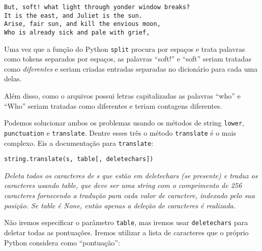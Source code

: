 \beforeverb
\begin{verbatim}
But, soft! what light through yonder window breaks?
It is the east, and Juliet is the sun.
Arise, fair sun, and kill the envious moon,
Who is already sick and pale with grief,
\end{verbatim}
\afterverb
%
Uma vez que a função do Python {\tt split} procura por espaços e trata palavras como tokens separados por espaços, as palavras ``soft!'' e ``soft'' seriam tratadas como \emph{diferentes} e seriam criadas entradas separadas no dicionário para cada uma delas.

Além disso, como o arquivos possui letras capitalizadas as palavras ``who'' e ``Who'' seriam tratadas como diferentes e teriam contagens diferentes.

Podemos solucionar ambos os problemas usando os métodos de string {\tt lower}, {\tt punctuation} e {\tt translate}. Dentre esses três o método {\tt translate} é o mais complexo. Eis a documentação para {\tt translate}:

\verb"string.translate(s, table[, deletechars])"

\emph{Deleta todos os caracteres de s que estão em deletechars (se presente) e traduz os caracteres usando table, que deve ser uma string com o comprimento de 256 caracteres fornecendo a tradução para cada valor de caractere, indexado pelo sua posição. Se table é None, então apenas a deleção de caracteres é realizada.}

Não iremos especificar o parâmetro {\tt table}, mas iremos usar {\tt deletechars} para deletar todas as pontuações. Iremos utilizar a lista de caracteres que o próprio Python considera como ``pontuação'':

